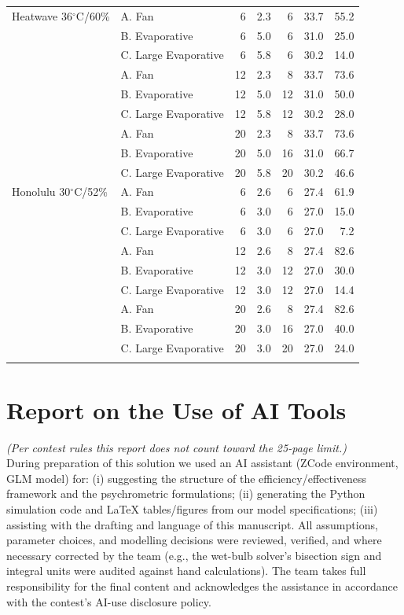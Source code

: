 \documentclass[11pt]{article}
\newcommand{\degrees}{\ensuremath{^\circ}}
\begin{document}
\begin{table}[H]
\begin{tabular}{@{}llrrrrr@{}}
\addlinespace
Heatwave 36\degrees C/60\% & A. Fan & 6 & 2.3 & 6 & 33.7 & 55.2 \\
 & B. Evaporative & 6 & 5.0 & 6 & 31.0 & 25.0 \\
 & C. Large Evaporative & 6 & 5.8 & 6 & 30.2 & 14.0 \\
 & A. Fan & 12 & 2.3 & 8 & 33.7 & 73.6 \\
 & B. Evaporative & 12 & 5.0 & 12 & 31.0 & 50.0 \\
 & C. Large Evaporative & 12 & 5.8 & 12 & 30.2 & 28.0 \\
 & A. Fan & 20 & 2.3 & 8 & 33.7 & 73.6 \\
 & B. Evaporative & 20 & 5.0 & 16 & 31.0 & 66.7 \\
 & C. Large Evaporative & 20 & 5.8 & 20 & 30.2 & 46.6 \\
\addlinespace
Honolulu 30\degrees C/52\% & A. Fan & 6 & 2.6 & 6 & 27.4 & 61.9 \\
 & B. Evaporative & 6 & 3.0 & 6 & 27.0 & 15.0 \\
 & C. Large Evaporative & 6 & 3.0 & 6 & 27.0 & 7.2 \\
 & A. Fan & 12 & 2.6 & 8 & 27.4 & 82.6 \\
 & B. Evaporative & 12 & 3.0 & 12 & 27.0 & 30.0 \\
 & C. Large Evaporative & 12 & 3.0 & 12 & 27.0 & 14.4 \\
 & A. Fan & 20 & 2.6 & 8 & 27.4 & 82.6 \\
 & B. Evaporative & 20 & 3.0 & 16 & 27.0 & 40.0 \\
 & C. Large Evaporative & 20 & 3.0 & 20 & 27.0 & 24.0 \\
\addlinespace
\bottomrule
\end{tabular}
\end{table}

\newpage
\section*{Report on the Use of AI Tools}
\textit{(Per contest rules this report does not count toward the 25-page limit.)}\\[4pt]
During preparation of this solution we used an AI assistant (ZCode environment, GLM model) for: (i) suggesting the structure of the efficiency/effectiveness framework and the psychrometric formulations; (ii) generating the Python simulation code and LaTeX tables/figures from our model specifications; (iii) assisting with the drafting and language of this manuscript. All assumptions, parameter choices, and modelling decisions were reviewed, verified, and where necessary corrected by the team (e.g., the wet-bulb solver's bisection sign and integral units were audited against hand calculations). The team takes full responsibility for the final content and acknowledges the assistance in accordance with the contest's AI-use disclosure policy.
\end{document}

